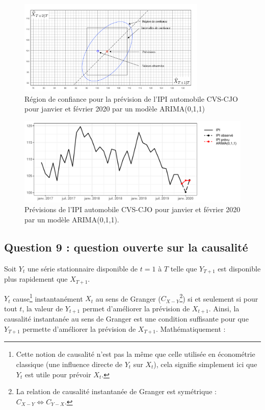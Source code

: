 \documentclass[french]{article}
\let\rmarkdownfootnote\footnote%
\def\footnote{\protect\rmarkdownfootnote}
\begin{document}
\begin{figure}[htbp]
\begin{center}\includegraphics[width = 0.8\textwidth]{img/ellipse} \end{center}
\captionsetup{margin=0cm,format=hang,justification=justified}
\caption{Région de confiance pour la prévision de l'IPI automobile CVS-CJO pour janvier et février 2020 par un modèle ARIMA(0,1,1)}\label{fig:RegIC}
\end{figure}

\begin{figure}

{\centering \includegraphics{img/rmd-prevIpi-1} 

}

\caption{Prévisions de l'IPI automobile CVS-CJO pour janvier et février 2020 par un modèle ARIMA(0,1,1).}\label{fig:prevIpi}
\end{figure}

\hypertarget{question-9-question-ouverte-sur-la-causalituxe9}{%
\subsection{Question 9 : question ouverte sur la causalité}\label{question-9-question-ouverte-sur-la-causalituxe9}}

Soit \(Y_t\) une série stationnaire disponible de \(t = 1\) à \(T\) telle que \(Y_{T+1}\) est disponible plus rapidement que \(X_{T+1}\).

\(Y_t\) cause\footnote{Cette notion de causalité n'est pas la même que celle utilisée en économétrie classique (une influence directe de \(Y_t\) sur \(X_t\)), cela signifie simplement ici que \(Y_t\) est utile pour prévoir \(X_t\).} instantanément \(X_t\) au sens de Granger (\(C_{X - Y}\)\footnote{La relation de causalité instantanée de Granger est symétrique : \(C_{X - Y} \iff C_{Y - X}\).}) si et seulement si pour tout \(t\), la valeur de \(Y_{t+1}\) permet d'améliorer la prévision de \(X_{t+1}\).
Ainsi, la causalité instantanée au sens de Granger est une condition suffisante pour que \(Y_{T+1}\) permette d'améliorer la prévision de \(X_{T+1}\).
Mathématiquement :
\end{document}
